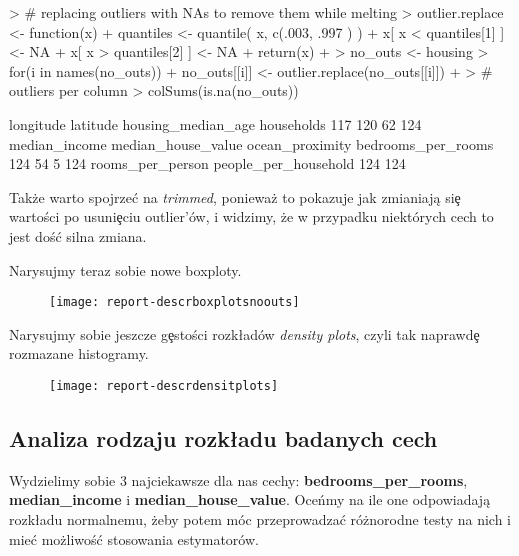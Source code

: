 \documentclass{article}
\begin{document}
\begin{Schunk}
\begin{Sinput}
> # replacing outliers with NAs to remove them while melting
> outlier.replace <- function(x){
+   quantiles <- quantile( x, c(.003, .997 ) )
+   x[ x < quantiles[1] ] <- NA
+   x[ x > quantiles[2] ] <- NA
+   return(x)
+ }
> no_outs <- housing
> for(i in names(no_outs)){
+   no_outs[[i]] <- outlier.replace(no_outs[[i]])
+ }
> # outliers per column
> colSums(is.na(no_outs))
\end{Sinput}
\begin{Soutput}
           longitude             latitude   housing_median_age           households 
                 117                  120                   62                  124 
       median_income   median_house_value      ocean_proximity   bedrooms_per_rooms 
                 124                   54                    5                  124 
    rooms_per_person people_per_household 
                 124                  124 
\end{Soutput}
\end{Schunk}

\noindent
\quad Także warto spojrze\'c na \textit{trimmed}, ponieważ to pokazuje jak zmianiają si\c e wartości po usuni\c eciu outlier'ów, i widzimy, że w przypadku niektórych cech to jest doś\'c silna zmiana.

\noindent
\quad Narysujmy teraz sobie nowe boxploty.

\begin{figure}[h!]
\centering
\texttt{[image: report-descrboxplotsnoouts]}
\end{figure}

\noindent
\quad Narysujmy sobie jeszcze g\c estości rozk\l adów \textit{density plots}, czyli tak naprawd\c e rozmazane histogramy.

\begin{figure}[h!]
\centering
\texttt{[image: report-descrdensitplots]}
\end{figure}

\subsection{Analiza rodzaju rozk\l adu badanych cech}
\quad Wydzielimy sobie 3 najciekawsze dla nas cechy: \textbf{bedrooms\_per\_rooms}, \textbf{median\_income} i \textbf{median\_house\_value}. Oceńmy na ile one odpowiadają rozk\l adu normalnemu, żeby potem móc przeprowadza\'c różnorodne testy na nich i mie\'c możliwoś\'c stosowania estymatorów.
\end{document}
